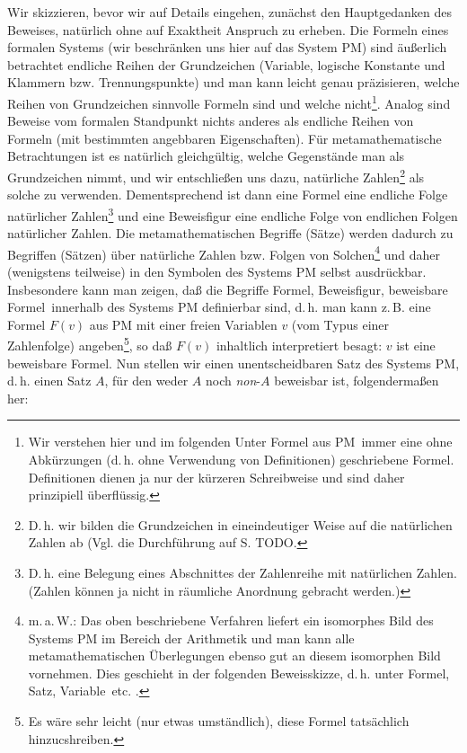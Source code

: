 \documentclass{scrartcl}
\begin{document}
Wir skizzieren, bevor wir auf Details eingehen, zunächst
den Hauptgedanken des Beweises, natürlich ohne auf 
Exaktheit Anspruch zu erheben. Die Formeln eines formalen Systems (wir beschränken uns hier auf das System PM) sind
äußerlich betrachtet endliche Reihen der Grundzeichen
(Variable, logische Konstante und Klammern bzw.
Trennungspunkte) und man kann leicht genau präzisieren,
welche Reihen von Grundzeichen sinnvolle Formeln sind
und welche nicht\footnote{Wir verstehen hier und im folgenden
Unter \glqq Formel aus PM\grqq\ immer eine ohne Abkürzungen (d.\,h. ohne Verwendung von Definitionen)
geschriebene Formel. Definitionen dienen ja nur der kürzeren
Schreibweise und sind daher prinzipiell überflüssig.}.
Analog sind Beweise vom formalen Standpunkt nichts anderes
als endliche Reihen von Formeln (mit bestimmten angebbaren
Eigenschaften). Für metamathematische Betrachtungen
ist es natürlich gleichgültig, welche Gegenstände man
als Grundzeichen nimmt, und wir entschließen uns dazu,
natürliche Zahlen\footnote{D.\,h. wir bilden die Grundzeichen in eineindeutiger Weise auf die natürlichen Zahlen ab (Vgl. die Durchführung auf S. TODO.}
als solche zu verwenden. Dementsprechend ist dann eine
Formel eine endliche Folge natürlicher 
Zahlen\footnote{D.\,h. eine Belegung eines Abschnittes der Zahlenreihe mit natürlichen Zahlen. (Zahlen können ja nicht in räumliche Anordnung gebracht werden.)} und eine Beweisfigur eine
endliche Folge von endlichen Folgen natürlicher Zahlen.
Die metamathematischen Begriffe (Sätze) werden dadurch zu
Begriffen (Sätzen) über natürliche Zahlen bzw. Folgen von
Solchen\footnote{m.\,a.\,W.: Das oben beschriebene Verfahren liefert ein isomorphes Bild des Systems PM im Bereich der Arithmetik und man kann alle metamathematischen Überlegungen ebenso gut an diesem isomorphen Bild vornehmen. Dies geschieht in der folgenden Beweisskizze, d.\,h. unter \glqq Formel\grqq, \glqq Satz\grqq, \glqq Variable\grqq\ etc. .}
und daher (wenigstens teilweise) in den Symbolen
des Systems PM selbst ausdrückbar. Insbesondere kann man
zeigen, daß die Begriffe \glqq Formel\grqq, 
\glqq Beweisfigur\grqq, 
\glqq beweisbare Formel\grqq\ innerhalb des Systems PM 
definierbar sind, d.\,h. man kann z.\,B. eine Formel 
$F(v)$ aus PM mit einer freien Variablen $v$ (vom Typus 
einer Zahlenfolge) angeben\footnote{Es wäre sehr leicht (nur etwas umständlich), diese Formel tatsächlich hinzucshreiben.},
so daß $F(v)$ inhaltlich interpretiert besagt:
$v$ ist eine beweisbare Formel. Nun stellen wir einen
unentscheidbaren Satz des Systems PM, d.\,h. einen
Satz $A$, für den weder $A$ noch \textit{non}-$A$ beweisbar
ist, folgendermaßen her:
\end{document}
